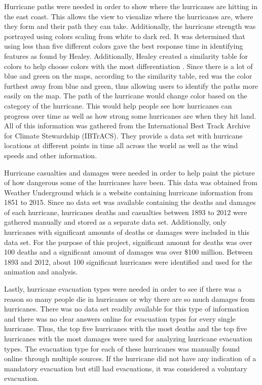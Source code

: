 Hurricane paths were needed in order to show where the hurricanes are hitting in the east coast. This allows the view to visualize where the hurricanes are, where they form and their path they can take. Additionally, the hurricane strength was portrayed using colors scaling from white to dark red. It was determined that using less than five different colors gave the best response time in identifying features as found by Healey. Additionally, Healey created a similarity table for colors to help choose colors with the most differentiation \cite{healey1996choosing}. Since there is a lot of blue and green on the maps, according to the similarity table, red was the color furthest away from blue and green, thus allowing users to identify the paths more easily on the map. The path of the hurricane would change color based on the category of the hurricane. This would help people see how hurricanes can progress over time as well as how strong some hurricanes are when they hit land. All of this information was gathered from the International Best Track Archive for Climate Stewardship (IBTrACS). They provide a data set with hurricane locations at different points in time all across the world as well as the wind speeds and other information. 

Hurricane casualties and damages were needed in order to help paint the picture of how dangerous some of the hurricanes have been. This data was obtained from Weather Underground which is a website containing hurricane information from 1851 to 2015. Since no data set was available containing the deaths and damages of each hurricane, hurricanes deaths and casualties between 1893 to 2012 were gathered manually and stored as a separate data set. Additionally, only hurricanes with significant amounts of deaths or damages were included in this data set. For the purpose of this project, significant amount for deaths was over 100 deaths and a significant amount of damages was over \$100 million. Between 1893 and 2012, about 100 significant hurricanes were identified and used for the animation and analysis.

Lastly, hurricane evacuation types were needed in order to see if there was a reason so many people die in hurricanes or why there are so much damages from hurricanes. There was no data set readily available for this type of information and there was no clear answers online for evacuation types for every single hurricane. Thus, the top five hurricanes with the most deaths and the top five hurricanes with the most damages were used for analyzing hurricane evacuation types. The evacuation type for each of these hurricanes was manually found online through multiple sources. If the hurricane did not have any indication of a mandatory evacuation but still had evacuations, it was considered a voluntary evacuation. 

